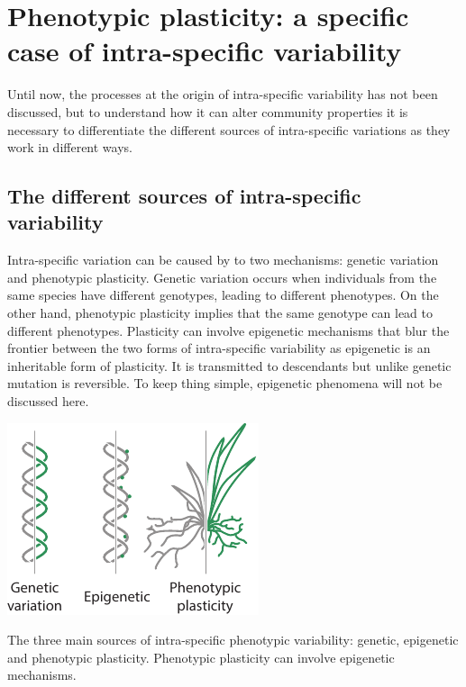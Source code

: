 \section{Phenotypic plasticity: a specific case of intra-specific variability}

Until now, the processes at the origin of intra-specific variability has not been discussed, but to understand how it can alter community properties it is necessary to differentiate the different sources of intra-specific variations as they work in different ways.

\subsection{The different sources of intra-specific variability}

Intra-specific variation can be caused by to two mechanisms: genetic variation and phenotypic plasticity. Genetic variation occurs when individuals from the same species have different genotypes, leading to different phenotypes. On the other hand, phenotypic plasticity implies that the same genotype can lead to different phenotypes. Plasticity can involve epigenetic mechanisms \parencite{
zhang_epigenetic_2013, nicotra_adaptive_2015, beaman_evolution_2016} that blur the frontier between the two forms of intra-specific variability as epigenetic is an inheritable form of plasticity. It is transmitted to descendants but unlike genetic mutation is reversible. To keep thing simple, epigenetic phenomena will not be discussed here.

\begin{marginfigure}[-12pt]
    \includegraphics{./1_Introduction/graphics/sources.pdf}
  \caption[Sources of intra-specific variability]{The three main sources of intra-specific phenotypic variability: genetic, epigenetic and phenotypic plasticity. Phenotypic plasticity can involve epigenetic mechanisms.}
  \label{fg:sources}
\end{marginfigure}

